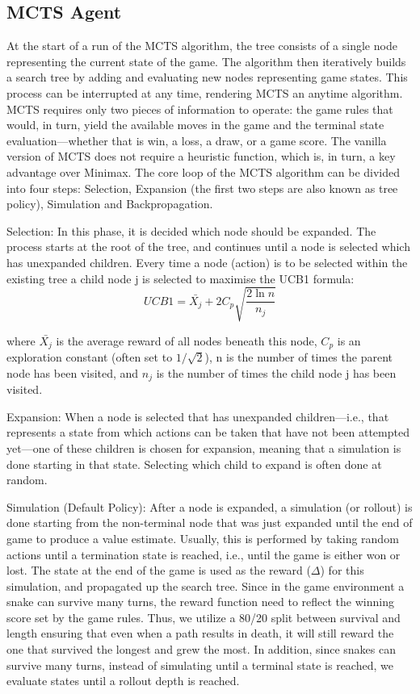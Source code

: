 \documentclass[12pt,a4paper]{article}
\begin{document}
\subsection{MCTS Agent}
At the start of a run of the MCTS algorithm, the tree consists of a single node representing the current state of the game. The algorithm then iteratively builds a search tree by adding and evaluating new nodes representing game states. This process can be interrupted at any time, rendering MCTS an anytime algorithm. MCTS requires only two pieces of information to operate: the game rules that would, in turn, yield the available moves in the game and the terminal state evaluation—whether that is win, a loss, a draw, or a game score. The vanilla version of MCTS does not require a heuristic function, which is, in turn, a key advantage over Minimax. The core loop of the MCTS algorithm can be divided into four steps: Selection, Expansion (the first two steps are also known as tree policy), Simulation and Backpropagation.

Selection: In this phase, it is decided which node should be expanded. The process starts at the root of the tree, and continues until a node is selected which has unexpanded children. Every time a node (action) is to be selected within the existing tree a child node j is selected to maximise the UCB1 formula:
\begin{equation}
    UCB1 = \bar{X_j} + 2 C_p \sqrt{\frac{2 \ln{n}}{n_j}}
\end{equation}

where $\bar{X_j}$ is the average reward of all nodes beneath this node, $C_p$ is an exploration constant (often set to $1/\sqrt{2}$), n is the number of times the parent node has been visited, and $n_j$ is the number of times the child node j has been visited.

Expansion: When a node is selected that has unexpanded children—i.e., that represents a state from which actions can be taken that have not been attempted yet—one of these children is chosen for expansion, meaning that a simulation is done starting in that state. Selecting which child to expand is often done at random.

Simulation (Default Policy): After a node is expanded, a simulation (or rollout) is done starting from the non-terminal node that was just expanded until the end of game to produce a value estimate. Usually, this is performed by taking random actions until a termination state is reached, i.e., until the game is either won or lost. The state at the end of the game is used as the reward ($\Delta$) for this simulation, and propagated up the search tree. Since in the game environment a snake can survive many turns, the reward function need to reflect the winning score set by the game rules. Thus, we utilize a 80/20 split between survival and length ensuring that even when a path results in death, it will still reward the one that survived the longest and grew the most. In addition, since snakes can survive many turns, instead of simulating until a terminal state is reached, we evaluate states until a rollout depth is reached.
\end{document}

